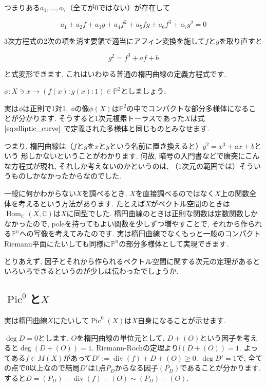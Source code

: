 \documentclass{jsarticle}
\newcommand{\CC}{\mathbb{C}}
\newcommand{\PP}{\mathbb{P}}
\newcommand{\makeop}[1]{\mathop{\mathrm{#1}}\nolimits}
\def\Hom{\makeop{Hom}}
\def\Pic{\makeop{Pic}}
\def\div{\makeop{div}}
\theoremstyle{definition}
\numberwithin{theorem}{section}
\begin{document}
つまりある$a_1, \ldots, a_7$（全てが0ではない）が存在して

\begin{equation*}
a_1 + a_2f + a_3g + a_4f^2+a_5fg+a_6f^3+a_7g^2 = 0
\end{equation*}

3次方程式の2次の項を消す要領で適当にアフィン変換を施して$f$と$g$を取り直すと

\begin{equation}
\label{eq:elliptic_curve}
g^2 = f^3 + af + b
\end{equation}

と式変形できます. これはいわゆる普通の楕円曲線の定義方程式です.

$\phi: X \ni x \rightarrow (f(x):g(x):1) \in \PP^2$としましょう.

実は$\phi$は正則で1対1, $\phi$の像$\phi(X)$は$\PP^2$の中でコンパクトな部分多様体になることが分かります. そうすると1次元複素トーラスであった$X$は式 $\ref{eq:elliptic_curve}$ で定義された多様体と同じものとみなせます.

つまり, 楕円曲線は（$f$と$g$を$x$と$y$という名前に置き換えると）$y^2 = x^3+ax+b$という
形しかないということがわかります. 何故, 暗号の入門書などで唐突にこんな方程式が現れ, それしか考えないのかというのは, （1次元の範囲では）そういうものしかなかったからなのでした.

一般に何かわからない$X$を調べるとき, $X$を直接調べるのではなく$X$上の関数全体を考えるという方法があります. たとえば$X$がベクトル空間のときは$\Hom_\CC(X, \CC)$は$X$に同型でした. 楕円曲線のときは正則な関数は定数関数しかなかったので, poleを持ってもよい関数を少しずつ増やすことで, それから作られる$\PP^n$への写像を考えてみたのです. 実は楕円曲線でなくもっと一般のコンパクトRiemann平面にたいしても同様に$\PP^n$の部分多様体として実現できます.

とりあえず, 因子とそれから作られるベクトル空間に関する次元の定理があるといろいろできるというのが少しは伝わったでしょうか.

\subsection{$\Pic^0$と$X$}
実は楕円曲線$X$にたいして$\Pic^0(X)$は$X$自身になることが示せます.

$\deg D = 0$とします. $O$を楕円曲線の単位元として, $D + (O)$という因子を考えると$\deg(D + (O)) = 1$. Riemann-Rochの定理より$l(D + (O)) = 1$. よってある$f \in M(X)$があって$D' := \div(f) + D + (O) \geq 0$. $\deg D' = 1$で, 全ての点で0以上なので結局$D'$は1点$P_D$からなる因子$(P_D)$であることが分かります. すると$D = (P_D) - \div(f) - (O) \sim (P_D) - (O)$.
\end{document}
